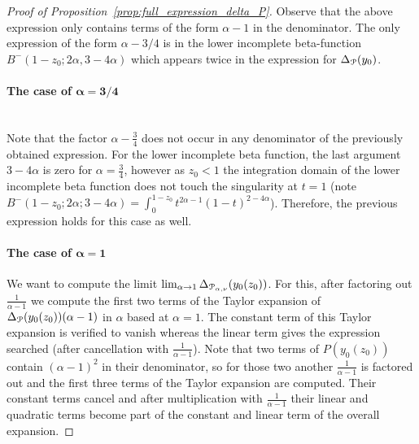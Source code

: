 \begin{proof}[Proof of Proposition~\ref{prop:full_expression_delta_P}]
Observe that the above expression only contains terms of the form $\alpha - 1$ in the denominator. The only expression of the form $\alpha - 3/4$ is in the lower incomplete beta-function $B^-(1 - z_0; 2 \alpha, 3 - 4 \alpha)$ which appears twice in the expression for $\Delta_{{\mathcal P}}(y_0)$. 

\paragraph{The case of $\bm{\alpha = 3/4}$}\hfil\\

Note that the factor $\alpha-\frac{3}{4}$ does not occur in any denominator of the previously obtained expression. For the lower incomplete beta function, the last argument $3-4\alpha$ is zero for $\alpha=\frac{3}{4}$, however as $z_0 < 1$ the integration domain of the lower incomplete beta function does not touch the singularity at $t=1$ (note $B^-(1-z_0;2\alpha;3-4\alpha) = \int_0^{1-z_0} t^{2\alpha-1} (1-t)^{2-4\alpha}$). Therefore, the previous expression holds for this case as well.


\paragraph{The case of $\bm{\alpha = 1}$}


We want to compute the limit $\lim_{\alpha \rightarrow 1} \Delta_{{\mathcal P}_{\alpha,\nu}}(y_0(z_0))$. For this, after factoring out $\frac{1}{\alpha-1}$ we compute the first two terms of the Taylor expansion of $\Delta_{{\mathcal P}}(y_0(z_0))(\alpha-1)$ in $\alpha$ based at $\alpha = 1$. The constant term of this Taylor expansion is verified to vanish whereas the linear term gives the expression searched (after cancellation with $\frac{1}{\alpha-1}$). Note that two terms of $P(y_0(z_0))$ contain $(\alpha-1)^2$ in their denominator, so for those two another $\frac{1}{\alpha-1}$ is factored out and the first three terms of the Taylor expansion are computed. Their constant terms cancel and after multiplication with $\frac{1}{\alpha-1}$ their linear and quadratic terms become part of the constant and linear term of the overall expansion.


\end{proof}
